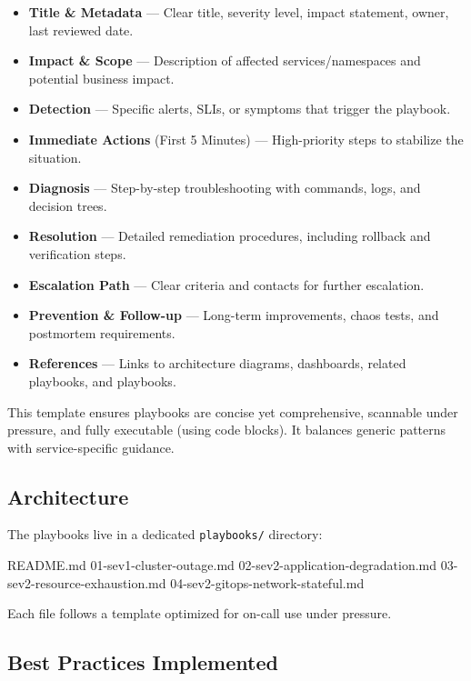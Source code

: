 \documentclass{article}
\let\originalfootnotesize\footnotesize
\let\oldverbatim\verbatim
\let\oldendverbatim\endverbatim
\renewenvironment{verbatim}{\originalfootnotesize\oldverbatim}{\oldendverbatim}
\begin{document}
\begin{itemize}
    \item \textbf{Title \& Metadata} — Clear title, severity level, impact statement, owner, last reviewed date.
    \item \textbf{Impact \& Scope} — Description of affected services/namespaces and potential business impact.
    \item \textbf{Detection} — Specific alerts, SLIs, or symptoms that trigger the playbook.
    \item \textbf{Immediate Actions} (First 5 Minutes) — High-priority steps to stabilize the situation.
    \item \textbf{Diagnosis} — Step-by-step troubleshooting with commands, logs, and decision trees.
    \item \textbf{Resolution} — Detailed remediation procedures, including rollback and verification steps.
    \item \textbf{Escalation Path} — Clear criteria and contacts for further escalation.
    \item \textbf{Prevention \& Follow-up} — Long-term improvements, chaos tests, and postmortem requirements.
    \item \textbf{References} — Links to architecture diagrams, dashboards, related playbooks, and playbooks.
\end{itemize}

This template ensures playbooks are concise yet comprehensive, scannable under pressure,
and fully executable (using code blocks). It balances generic patterns with service-specific guidance.

\subsection{Architecture}

The playbooks live in a dedicated \texttt{playbooks/} directory:

\begin{verbatim}
  README.md
  01-sev1-cluster-outage.md
  02-sev2-application-degradation.md
  03-sev2-resource-exhaustion.md
  04-sev2-gitops-network-stateful.md
\end{verbatim}

Each file follows a template optimized for on-call use under pressure.

\subsection{Best Practices Implemented}
\end{document}
